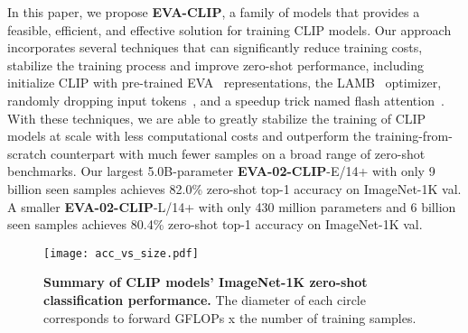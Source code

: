 \documentclass[10pt,twocolumn,letterpaper]{article}
\newcommand{\evablue}[1]{\textcolor{00blue!80}{#1}}
\newcommand{\evaclip}{{\textbf{\evablue{EVA-CLIP}}}\xspace}
\newcommand{\evaTwoclip}{{\textbf{\evablue{EVA-02-CLIP}}}\xspace}
\begin{document}
In this paper, we propose \evaclip, a family of models that provides a feasible, efficient, and effective solution for training CLIP models. Our approach incorporates several techniques that can significantly reduce training costs, stabilize the training process and improve zero-shot performance, including initialize CLIP with pre-trained EVA~\cite{eva, EVA02} representations, the LAMB~\cite{lamb} optimizer, randomly dropping input tokens~\cite{flip}, and a speedup trick named flash attention~\cite{flashattention}. With these techniques, we are able to greatly stabilize the training of CLIP models at scale with less computational costs and outperform the training-from-scratch counterpart with much fewer samples on a broad range of zero-shot benchmarks. Our largest 5.0B-parameter \evaTwoclip-E/14+ with only 9 billion seen samples achieves 82.0\% zero-shot top-1 accuracy on ImageNet-1K val. A smaller \evaTwoclip-L/14+ with only 430 million parameters and 6 billion seen samples achieves 80.4\% zero-shot top-1 accuracy on ImageNet-1K val.

\begin{figure}[t]
    \centering
    \vspace{3.5em}
    \texttt{[image: acc\_vs\_size.pdf]}
    \caption{\textbf{Summary of CLIP models' ImageNet-1K zero-shot classification performance.} The diameter of each circle corresponds to forward GFLOPs x the number of training samples.}
    \label{fig:teaser}
\end{figure}
\end{document}

